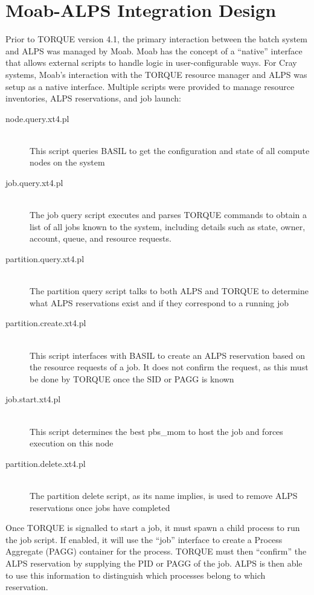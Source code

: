 \section{Moab-ALPS Integration Design}

Prior to TORQUE version 4.1, the primary interaction between the batch system
and ALPS was managed by Moab.  Moab has the concept of a ``native'' interface
that allows external scripts to handle logic in user-configurable ways.  For
Cray systems, Moab's interaction with the TORQUE resource manager and ALPS was
setup as a native interface.  Multiple scripts were provided to manage
resource inventories, ALPS reservations, and job launch:

\begin{description}
  \item[node.query.xt4.pl] \hfill \\
    This script queries BASIL to get the configuration and state of all compute
    nodes on the system
  \item[job.query.xt4.pl] \hfill \\
    The job query script executes and parses TORQUE commands to obtain a list
    of all jobs known to the system, including details such as state, owner, 
    account, queue, and resource requests.
  \item[partition.query.xt4.pl] \hfill \\
    The partition query script talks to both ALPS and TORQUE to determine what 
    ALPS reservations exist and if they correspond to a running job
  \item[partition.create.xt4.pl] \hfill \\
    This script interfaces with BASIL to create an ALPS reservation based on the 
    resource requests of a job. It does not confirm the request, as this must be
    done by TORQUE once the SID or PAGG is known
  \item[job.start.xt4.pl] \hfill \\
    This script determines the best pbs_mom to host the job and forces execution
    on this node
  \item[partition.delete.xt4.pl] \hfill \\
    The partition delete script, as its name implies, is used to remove ALPS 
    reservations once jobs have completed
\end{description}

Once TORQUE is signalled to start a job, it must spawn a child process to run
the job script.  If enabled, it will use the ``job'' interface to create a
Process Aggregate (PAGG) container for the process.  TORQUE must then
``confirm'' the ALPS reservation by supplying the PID or PAGG of the job.  ALPS
is then able to use this information to distinguish which processes belong to
which reservation.

